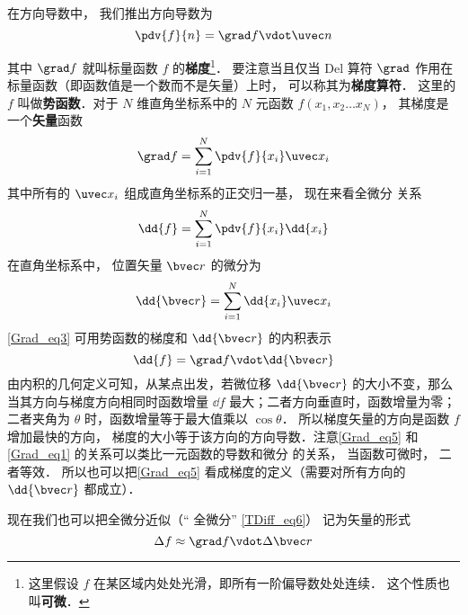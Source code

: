 

在方向导数中， 我们推出方向导数为
\begin{equation}\label{Grad_eq1}
\pdv{f}{n} = \grad f \vdot \uvec n
\end{equation}

其中 $\grad f$ 就叫标量函数 $f$ 的\textbf{梯度}\footnote{这里假设 $f$ 在某区域内处处光滑，即所有一阶偏导数处处连续． 这个性质也叫\textbf{可微}．}． 要注意当且仅当 Del 算符 $\grad$ 作用在标量函数（即函数值是一个数而不是矢量）上时， 可以称其为\textbf{梯度算符}． 这里的 $f$ 叫做\textbf{势函数}．对于 $N$ 维直角坐标系中的 $N$ 元函数 $f(x_1,x_2\dots x_N)$， 其梯度是一个\textbf{矢量}函数
\begin{equation}
\grad f = \sum_{i=1}^{N}\pdv{f}{x_i}\uvec x_i
\end{equation}
其中所有的 $\uvec x_i$ 组成直角坐标系的正交归一基， 现在来看全微分 关系
\begin{equation}\label{Grad_eq3}
\dd{f} = \sum_{i = 1}^N \pdv{f}{x_i} \dd{x_i}
\end{equation}
在直角坐标系中， 位置矢量 $\bvec r$ 的微分为
\begin{equation}
\dd{\bvec r} = \sum_{i=1}^{N} \dd{x_i} \uvec x_i
\end{equation}
\autoref{Grad_eq3} 可用势函数的梯度和 $\dd{\bvec r}$ 的内积表示
\begin{equation}\label{Grad_eq5}
\dd{f} = \grad f \vdot \dd{\bvec r}
\end{equation}
由内积的几何定义可知，从某点出发，若微位移 $\dd{\bvec r}$ 的大小不变，那么当其方向与梯度方向相同时函数增量 $\dd{f}$ 最大；二者方向垂直时，函数增量为零；二者夹角为 $\theta$ 时，函数增量等于最大值乘以 $\cos \theta$． 所以梯度矢量的方向是函数 $f$ 增加最快的方向， 梯度的大小等于该方向的方向导数．注意\autoref{Grad_eq5} 和\autoref{Grad_eq1} 的关系可以类比一元函数的导数和微分 的关系， 当函数可微时， 二者等效． 所以也可以把\autoref{Grad_eq5} 看成梯度的定义（需要对所有方向的 $\dd{\bvec r}$ 都成立）．

现在我们也可以把全微分近似（“ 全微分” \autoref{TDiff_eq6}） 记为矢量的形式
\begin{equation}\label{Grad_eq6}
\Delta f \approx \grad f \vdot \Delta \bvec r
\end{equation}

